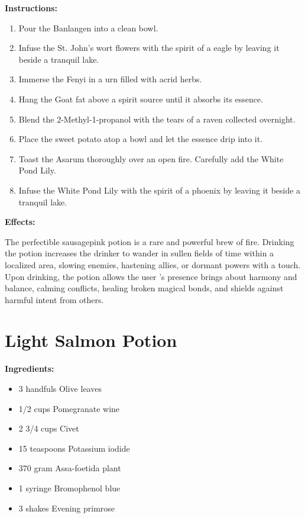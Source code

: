 \documentclass{article}
\begin{document}
\textbf{Instructions:}

\begin{enumerate}
  \item Pour the Banlangen into a clean bowl.
  \item Infuse the St. John's wort flowers with the spirit of a eagle by leaving it beside a tranquil lake.
  \item Immerse the Fenyi in a urn filled with acrid herbs.
  \item Hang the Goat fat above a spirit source until it absorbs its essence.
  \item Blend the 2-Methyl-1-propanol with the tears of a raven collected overnight.
  \item Place the sweet potato atop a bowl and let the essence drip into it.
  \item Toast the Asarum thoroughly over an open fire. Carefully add the White Pond Lily.
  \item Infuse the White Pond Lily with the spirit of a phoenix by leaving it beside a tranquil lake.
\end{enumerate}

\textbf{Effects:}

The perfectible sausagepink potion is a rare and powerful brew of fire. Drinking the potion increases the drinker to wander in sullen fields of time within a localized area, slowing enemies, hastening allies, or dormant powers with a touch. Upon drinking, the potion allows the user 's presence brings about harmony and balance, calming conflicts, healing broken magical bonds, and shields against harmful intent from others.

\newpage
\section*{Light Salmon Potion}

\textbf{Ingredients:}

\begin{itemize}
  \item 3 handfuls Olive leaves
  \item 1/2 cups Pomegranate wine
  \item 2 3/4 cups Civet
  \item 15 teaspoons Potassium iodide
  \item 370 gram Assa-foetida plant
  \item 1 syringe Bromophenol blue
  \item 3 shakes Evening primrose
\end{itemize}
\end{document}
